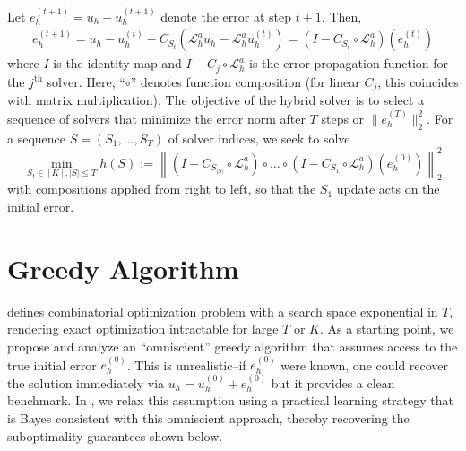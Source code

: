 \documentclass{article} %
\begin{document}
Let $e^{(t + 1)}_h = u_h - u^{\left(t + 1\right)}_h$ denote the error at step $t + 1$. Then, 
\begin{align*}
    e^{(t + 1)}_h = u_h -  u^{\left(t\right)}_h -C_{S_t}\left(\mathcal{L}_h^au_h - \mathcal{L}_h^au^{\left(t\right)}_h\right) = \left(I- C_{S_t} \circ \mathcal{L}_h^a\right)(e^{(t)}_h)
\end{align*}
where $I$ is the identity map and $I - C_{j} \circ\mathcal{L}_h^a$ is the error propagation function for the $j^{\text{th}}$ solver. Here, ``$\circ$'' denotes function composition (for linear $C_{j}$, this coincides with matrix multiplication).
The objective of the hybrid solver is to select a sequence of solvers that minimize the error norm after $T$ steps or $\|e^{(T)}_h\|_2^2$. For a sequence $S = (S_1, \dots, S_T)$ of solver indices,  we seek to solve 
\begin{equation} \label{eq:errorobjective}
    \min_{S_t \in [K], |S| \leq T} h(S) := \left\|\left(I - C_{S_{|S|}} \circ \mathcal{L}_h^a\right) \circ \dots \circ \left(I - C_{S_1} \circ \mathcal{L}_h^a\right)  \left(e^{(0)}_h \right)\right\|^2_2
\end{equation}
with compositions applied from right to left, so that the $S_1$ update acts on the initial error.



\section{Greedy Algorithm} \label{sec:greedy}

 defines combinatorial optimization problem with a search space exponential in $T$, rendering exact optimization intractable for large $T$ or $K$. As a starting point, we propose and analyze an ``omniscient'' greedy algorithm that assumes access to the true initial error $e^{(0)}_h$. This is unrealistic--if $e^{(0)}_h$ were known, one could recover the solution immediately via $u_h = u^{(0)}_h + e^{(0)}_h$ but it provides a clean benchmark.
In , we relax this assumption using a practical learning strategy that is Bayes consistent with this omniscient approach, thereby recovering the suboptimality guarantees shown below.
\end{document}
